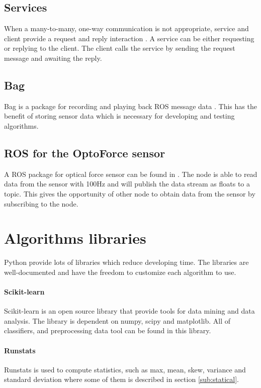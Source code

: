 \documentclass[USenglish]{ifimaster}  %
\begin{document}
\subsection{Services}
When a many-to-many, one-way communication is not appropriate, service and client provide a request and reply interaction \cite{ROSconcept}. A service can be either requesting or replying to the client. The client calls the service by sending the request message and awaiting the reply.


\subsection{Bag}
Bag is a package for recording and playing back ROS message data \cite{ROSconcept}. This has the benefit of storing sensor data which is necessary for developing and testing algorithms.


\subsection{ROS for the OptoForce sensor}  
A ROS package for optical force sensor can be found in \cite{optoRos}. The node is able to read data from the sensor with 100Hz and will publish the data stream as floats to a topic. This gives the opportunity of other node to obtain data from the sensor by subscribing to the node.


\section{Algorithms libraries}
Python provide lots of libraries which reduce developing time. The libraries are well-documented and have the freedom to customize each algorithm to use.

\paragraph{Scikit-learn}
Scikit-learn \cite{scikit-learn} is an open source library that provide tools for data mining and data analysis. The library is dependent on numpy, scipy and matplotlib. All of classifiers, and preprocessing data tool can be found in this library. 

\paragraph{Runstats}
Runstats \cite{runstats} is used to compute statistics, such as max, mean, skew, variance and standard deviation where some of them is described in section \ref{sub:statical}.
\end{document}
